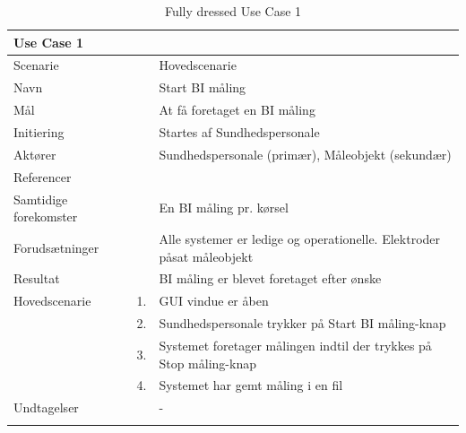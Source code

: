 \documentclass[main.tex]{subfiles}
\begin{document}
\begin{longtabu} to  %
	{\large \textbf{Use Case 1}} && \\
	\toprule
	Scenarie 				&&	Hovedscenarie\\
	Navn 					&& 	Start BI måling\\
	Mål 					&& 	At få foretaget en BI måling\\
	Initiering 				&& 	Startes af Sundhedspersonale\\
	Aktører 				&& 	Sundhedspersonale (primær), Måleobjekt (sekundær)\\
	Referencer 				&& 	\\
	Samtidige forekomster  	&& 	En BI måling pr. kørsel \\
	Forudsætninger 			&&	Alle systemer er ledige og operationelle. Elektroder påsat måleobjekt\\ 
	Resultat 				&& 	BI måling er blevet foretaget efter ønske\\ \midrule
	Hovedscenarie 			&    1. 	&	GUI vindue er åben\\				 	
							&    2. 	& 	Sundhedspersonale trykker på Start BI måling-knap\\ 
							& 	 3.		&	 Systemet foretager målingen indtil der trykkes på Stop måling-knap \\[-1ex]
                            & 	 4.		&	 Systemet har gemt måling i en fil \\[-1ex]
	Undtagelser 			&			& 	-  \\ \bottomrule
	
	\caption{Fully dressed Use Case 1}
	\label{UC1}
\end{longtabu}
\end{document}
